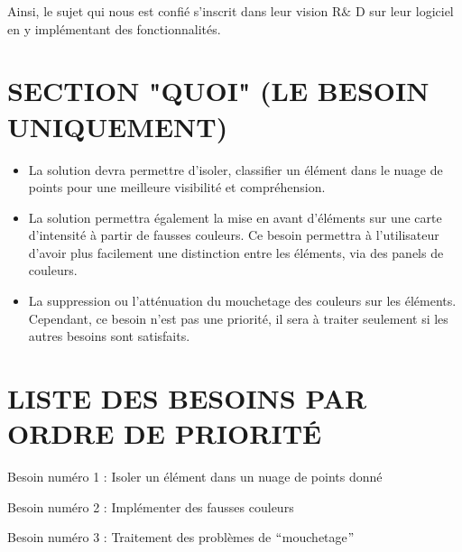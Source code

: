 \documentclass[12pt,titlepage]{report}
\begin{document}
\begin{justify}
Ainsi, le sujet qui nous est confié s’inscrit dans leur vision R$\&$ D sur leur logiciel en y implémentant des fonctionnalités.
\end{justify}\par


\vspace{\baselineskip}
\section{SECTION "QUOI"  (LE BESOIN UNIQUEMENT)}

\vspace{\baselineskip}
\begin{itemize}
	\item La solution devra permettre d’isoler, classifier un élément dans le nuage de points pour une meilleure visibilité et compréhension.\par

	\item La solution permettra également la mise en avant d’éléments sur une carte d’intensité à partir de fausses couleurs. Ce besoin permettra à l’utilisateur d’avoir plus facilement une distinction entre les éléments, via des panels de couleurs.\par

	\item La suppression ou l’atténuation du mouchetage des couleurs sur les éléments. Cependant, ce besoin n’est pas une priorité, il sera à traiter seulement si les autres besoins sont satisfaits.
\end{itemize}\par

\vspace{\baselineskip}
\section{LISTE DES BESOINS PAR ORDRE DE PRIORITÉ}

\vspace{\baselineskip}
Besoin numéro 1 : Isoler un élément dans un nuage de points donné\par

Besoin numéro 2 : Implémenter des fausses couleurs\par

Besoin numéro 3 : Traitement des problèmes de $``$mouchetage$"$ \par


\vspace{\baselineskip}
\end{document}
